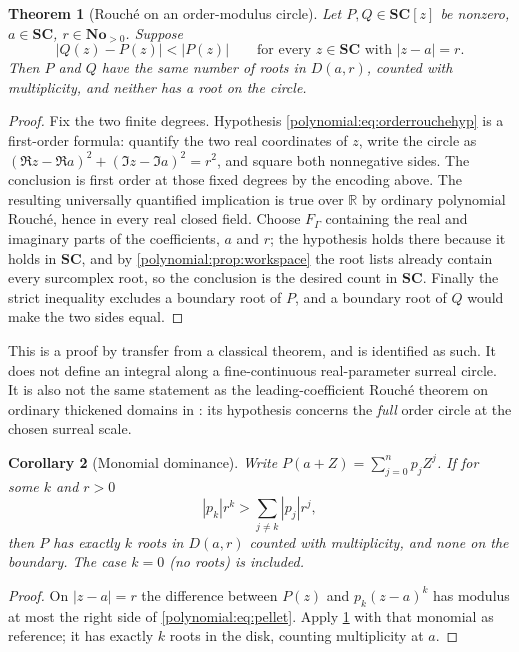 \documentclass[11pt,letterpaper]{article}
\numberwithin{equation}{section}
\newtheorem{theorem}{Theorem}[section]
\newtheorem{corollary}[theorem]{Corollary}
\theoremstyle{definition}
\theoremstyle{remark}\newtheorem{remark}[theorem]{Remark}
\newcommand{\No}{\mathbf{No}}
\newcommand{\SC}{\mathbf{SC}}
\newcommand{\R}{\mathbb R}
\begin{document}
\begin{theorem}[Rouch\'e on an order-modulus circle]\label{polynomial:thm:orderrouche}
Let $P,Q\in\SC[z]$ be nonzero, $a\in\SC$, $r\in\No_{>0}$. Suppose
\begin{equation}\label{polynomial:eq:orderrouchehyp}
 |Q(z)-P(z)|<|P(z)|\qquad\text{for every }z\in\SC\text{ with }|z-a|=r .
\end{equation}
Then $P$ and $Q$ have the same number of roots in $D(a,r)$, counted with
multiplicity, and neither has a root on the circle.
\end{theorem}
\begin{proof}
Fix the two finite degrees. Hypothesis \eqref{polynomial:eq:orderrouchehyp} is
a first-order formula: quantify the two real coordinates of $z$, write the
circle as $(\Re z-\Re a)^2+(\Im z-\Im a)^2=r^2$, and square both nonnegative
sides. The conclusion is first order at those fixed degrees by the encoding
above. The resulting universally quantified implication is true over $\R$ by
ordinary polynomial Rouch\'e, hence in every real closed field. Choose
$F_\Gamma$ containing the real and imaginary parts of the coefficients, $a$
and $r$; the hypothesis holds there because it holds in $\SC$, and by
\cref{polynomial:prop:workspace} the root lists already contain every
surcomplex root, so the conclusion is the desired count in $\SC$. Finally the
strict inequality excludes a boundary root of $P$, and a boundary root of $Q$
would make the two sides equal.
\end{proof}

This is a proof by transfer from a classical theorem, and is identified as
such. It does not define an integral along a fine-continuous real-parameter
surreal circle. It is also not the same statement as the leading-coefficient
Rouch\'e theorem on ordinary thickened domains in
\cite{polynomial:SourceAnalysis}: its hypothesis concerns the \emph{full}
order circle at the chosen surreal scale.

\begin{corollary}[Monomial dominance]\label{polynomial:cor:pellet}
Write $P(a+Z)=\sum_{j=0}^np_jZ^j$. If for some $k$ and $r>0$
\begin{equation}\label{polynomial:eq:pellet}
 |p_k|r^k>\sum_{j\ne k}|p_j|r^j ,
\end{equation}
then $P$ has exactly $k$ roots in $D(a,r)$ counted with multiplicity, and none
on the boundary. The case $k=0$ (no roots) is included.
\end{corollary}
\begin{proof}
On $|z-a|=r$ the difference between $P(z)$ and $p_k(z-a)^k$ has modulus at
most the right side of \eqref{polynomial:eq:pellet}. Apply
\cref{polynomial:thm:orderrouche} with that monomial as reference; it has
exactly $k$ roots in the disk, counting multiplicity at $a$.
\end{proof}
\end{document}

